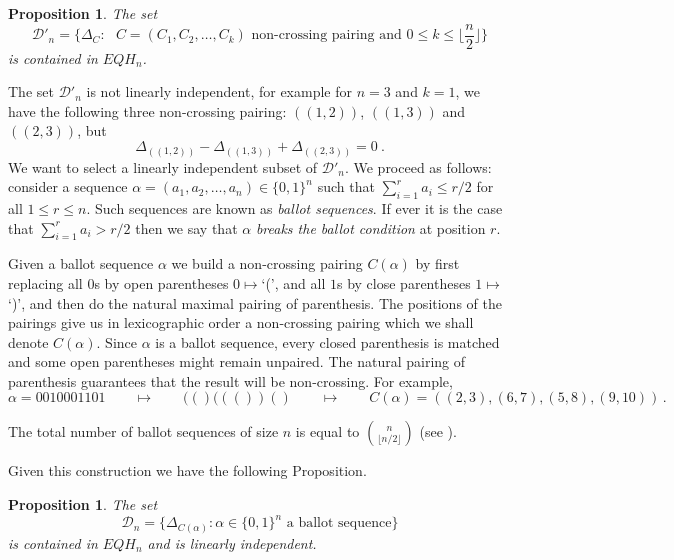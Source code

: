 \documentclass[submission]{FPSAC2023}
\newcommand{\defncolor}{\color{darkred}}
\newcommand{\defn}[1]{{\defncolor\emph{#1}}} %
\newtheorem{prop}[theorem]{Proposition}
\theoremstyle{definition}
\numberwithin{equation}{section}
\begin{document}
\begin{prop}\label{prop:harmelem}
The set
$${\mathcal D}'_n =\big\{ \Delta_C: \text{ $C=(C_1,C_2,\ldots, C_k)$  non-crossing pairing and $0\le k\le \lfloor \frac{n}{2}\rfloor$}\big\}
$$
is contained in $EQH_n $.
\end{prop}


The set ${\mathcal D}'_n$ is not linearly independent, for example for $n=3$ and $k=1$, we have the following three non-crossing pairing:
$((1,2))$, $((1,3))$ and $((2,3))$, but
\[
\Delta_{((1,2))} - \Delta_{((1,3))} + \Delta_{((2,3))} =0 ~.
\]
We want to select a linearly independent subset of ${\mathcal D}'_n$. We proceed as follows:
consider a sequence
$\alpha = (a_1, a_2, \ldots, a_n) \in \{0, 1\}^n$
such that $\sum_{i=1}^r a_i \leq r/2$ for all $1 \leq r \leq n$.
Such sequences are known as \defn{ballot sequences}.
If ever it is the case that $\sum_{i=1}^r a_i > r/2$ then we say that
$\alpha$ \defn{breaks the ballot condition} at position $r$.

Given a ballot sequence $\alpha$ we build a non-crossing pairing $C(\alpha)$ by first replacing all $0$s
by open parentheses $0\mapsto$`(',
and all $1$s by close parentheses $1\mapsto$`)',
and then do the natural maximal pairing of parenthesis. The positions of the pairings
give us in lexicographic order a non-crossing pairing which we shall denote $C(\alpha)$.
Since $\alpha$ is a ballot sequence, every closed parenthesis is matched
and some open parentheses might remain unpaired.
The natural pairing of parenthesis guarantees that the result will be non-crossing. For example,
\[
\alpha=0010001101 \qquad\mapsto\qquad (()((())() \qquad\mapsto\qquad C(\alpha)=((2,3),(6,7),(5,8),(9,10)) \,.
\]

The total number of ballot sequences of size $n$ is equal to $\binom{n}{\lfloor{n/2}\rfloor}$
(see \cite[\href{https://oeis.org/A001405}{A001405}]{OEIS}).

Given this construction we have the following Proposition.

\begin{prop}\label{prop:harmbasis}
The set
$${\mathcal D}_n =\big\{ \Delta_{C(\alpha)}:  \alpha \in \{0, 1\}^n \text{ a ballot sequence}\big\}
$$
is contained in $EQH_n$ and is linearly independent.
\end{prop}
\end{document}
